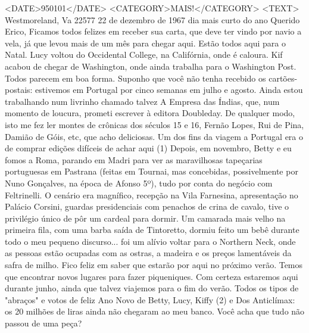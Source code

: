 <DATE>950101</DATE>
<CATEGORY>MAIS!</CATEGORY>
<TEXT>
Westmoreland, Va 22577
22 de dezembro de 1967
dia mais curto do ano
Querido Erico,
Ficamos todos felizes em receber sua carta, que deve ter vindo por navio a vela, já que levou mais de um mês para chegar aqui. Estão todos aqui para o Natal. Lucy voltou do Occidental College, na Califórnia, onde é caloura. Kif acabou de chegar de Washington, onde ainda trabalha para o  Washington Post. Todos parecem em boa forma. Suponho que você não tenha recebido os cartões-postais: estivemos em Portugal por cinco semanas em julho e agosto.
Ainda estou trabalhando num livrinho chamado talvez  A Empresa das Índias, que, num momento de loucura, prometi escrever à editora Doubleday. De qualquer modo, isto me fez ler montes de crônicas dos séculos 15 e 16, Fernão Lopes, Rui de Pina, Damião de Góis, etc, que acho deliciosas. Um dos fins da viagem a Portugal era o de comprar edições difíceis de achar aqui (1)
Depois, em novembro, Betty e eu fomos a Roma, parando em Madri para ver as maravilhosas tapeçarias portuguesas em Pastrana (feitas em Tournai, mas concebidas, possivelmente por Nuno Gonçalves, na época de Afonso 5º), tudo por conta do negócio com Feltrinelli.
O cenário era magnífico, recepção na Vila Farnesina, apresentação no Palácio Corsini, guardas presidenciais com penachos de crina de cavalo, tive o privilégio único de pôr um cardeal para dormir. Um camarada mais velho na primeira fila, com uma barba saída de Tintoretto, dormiu feito um bebê durante todo o meu pequeno discurso... foi um alívio voltar para o Northern Neck, onde as pessoas estão ocupadas com as ostras, a madeira e os preços lamentáveis da safra de milho.
Fico feliz em saber que estarão por aqui no próximo verão. Temos que encontrar novos lugares para fazer piqueniques. Com certeza estaremos aqui durante junho, ainda que talvez viajemos para o fim do verão.
Todos os tipos de "abraços" e votos de feliz Ano Novo de Betty, Lucy, Kiffy (2) e
Dos
Anticlímax: os 20 milhões de liras ainda não chegaram ao meu banco. Você acha que tudo não passou de uma peça?

